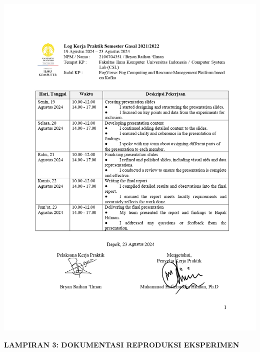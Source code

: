 \includegraphics[width=1\textwidth]{assets/pics/Log-12-CSL-Bryan Raihan Ilman-0001.jpg}

\newpage

\begin{center}
    \textbf{\large LAMPIRAN 3: DOKUMENTASI REPRODUKSI EKSPERIMEN}
\end{center}
\label{appendix:lampiran-3}


